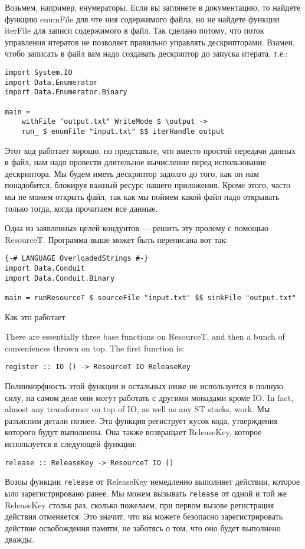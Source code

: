 Возьмем, например, енумераторы. Если вы заглянете в документацию, то найдете функцию
enumFile для чте ния содержимого файла, но не найдете функции iterFile для записи
содержимого в файл. Так сделано потому, что поток управления итератов не позволяет
правильно управлять дескрипторами. Взамен, чтобо записать в файл вам надо создавать
дескриптор до запуска итерата, т.е.: 

\begin{lstlisting}
import System.IO
import Data.Enumerator
import Data.Enumerator.Binary

main =
    withFile "output.txt" WriteMode $ \output ->
    run_ $ enumFile "input.txt" $$ iterHandle output
\end{lstlisting}

Этот код работает хорошо, но представьте, что вместо простой передачи данных в файл, нам
надо провести длительное вычисление перед использование дескриптора. Мы будем иметь
дескриптор задолго до того, как он нам понадобится, блокируя важный ресурс нашего
приложения. Кроме этого, часто мы не можем открыть файл, так как мы поймем какой файл
надо открывать только тогда, когда прочитаем все данные.

Одна из заявленных целей кондуитов --- решить эту пролему с помощью ResourceT. Программа
выше может быть переписана вот так:
\begin{lstlisting}
{-# LANGUAGE OverloadedStrings #-}
import Data.Conduit
import Data.Conduit.Binary

main = runResourceT $ sourceFile "input.txt" $$ sinkFile "output.txt"
\end{lstlisting}

Как это работает

There are essentially three base functions on ResourceT, and then a bunch of
conveniences thrown on top. The first function is:
\begin{lstlisting}
register :: IO () -> ResourceT IO ReleaseKey
\end{lstlisting}
Полииморфность этой функции и остальных ниже не используется в полную силу, на самом деле
они могут работать с другими монадами кроме IO. In fact, almost any transformer on top of
IO, as well as any ST stacks, work. Мы разъясним детали познее.
Эта функция региструет кусок кода, утверждения которого будут выполнены. Она также
возвращает ReleaseKey, которое используется в следующей функции:
\begin{lstlisting}release :: ReleaseKey -> ResourceT IO ()
\end{lstlisting}
Возоы функции \verb=release= от ReleaseKey немедленно выполняет действии, которое ыло
зарегистрировано ранее. Мы можем вызывать \verb=release= от одной и той же ReleaseKey
стольк раз, сколько пожелаем, при первом вызове регистрация действия отменяется. Это
значит, что вы можете безопасно зарегистрировать действие освобождения памяти, не
заботясь о том, что оно будет выполнено дважды.

